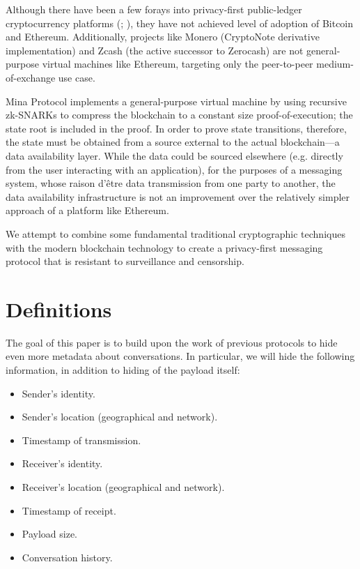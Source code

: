 Although there have been a few forays into privacy-first public-ledger cryptocurrency platforms (\cite[CryptoNote:][]{saberhagen_cryptonote_2013}; \cite[Zerocash:][]{sasson_zerocash_2014}), they have not achieved level of adoption of Bitcoin and Ethereum. Additionally, projects like Monero (CryptoNote derivative implementation) and Zcash (the active successor to Zerocash) are not general-purpose virtual machines like Ethereum, targeting only the peer-to-peer medium-of-exchange use case.

Mina Protocol implements a general-purpose virtual machine by using recursive zk-SNARKs to compress the blockchain to a constant size proof-of-execution; the state root is included in the proof. \parencite{bonneau_mina_2020} In order to prove state transitions, therefore, the state must be obtained from a source external to the actual blockchain---a data availability layer. While the data could be sourced elsewhere (e.g. directly from the user interacting with an application), for the purposes of a messaging system, whose raison d'\^{e}tre data transmission from one party to another, the data availability infrastructure is not an improvement over the relatively simpler approach of a platform like Ethereum.

We attempt to combine some fundamental traditional cryptographic techniques with the modern blockchain technology to create a privacy-first messaging protocol that is resistant to surveillance and censorship.

\section{Definitions}\label{definitions}

The goal of this paper is to build upon the work of previous protocols to hide even more metadata about conversations. In particular, we will hide the following information, in addition to hiding of the payload itself:

\begin{itemize}
\item
  Sender's identity.
\item
  Sender's location (geographical and network).
\item
  Timestamp of transmission.
\item
  Receiver's identity.
\item
  Receiver's location (geographical and network).
\item
  Timestamp of receipt.
\item
  Payload size.
\item
  Conversation history.
\end{itemize}

